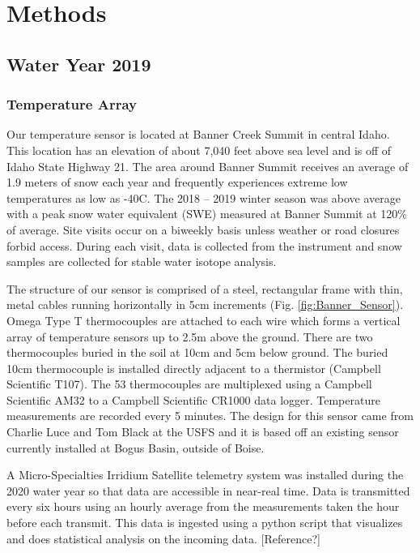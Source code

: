 \chapter{Methods}
\section{Water Year 2019} 
\subsection{Temperature Array}
Our temperature sensor is located at Banner Creek Summit in central Idaho. This location has an elevation of about 7,040 feet above sea level and is off of Idaho State Highway 21. The area around Banner Summit receives an average of 1.9 meters of snow each year and frequently experiences extreme low temperatures as low as -40\textdegree C. The 2018 -- 2019 winter season was above average with a peak snow water equivalent (SWE) measured at Banner Summit at 120\% of average. Site visits occur on a biweekly basis unless weather or road closures forbid access. During each visit, data is collected from the instrument and snow samples are collected for stable water isotope analysis.

The structure of our sensor is comprised of a steel, rectangular frame with thin, metal cables running horizontally in 5cm increments (Fig. \ref{fig:Banner_Sensor}). Omega Type T thermocouples are attached to each wire which forms a vertical array of temperature sensors up to 2.5m above the ground. There are two thermocouples buried in the soil at 10cm and 5cm below ground. The buried 10cm thermocouple is installed directly adjacent to a thermistor (Campbell Scientific T107). The 53 thermocouples are multiplexed using a Campbell Scientific AM32 to a Campbell Scientific CR1000 data logger. Temperature measurements are recorded every 5 minutes. The design for this sensor came from Charlie Luce and Tom Black at the USFS and it is based off an existing sensor currently installed at Bogus Basin, outside of Boise. 

A Micro-Specialties Irridium Satellite telemetry system was installed during the 2020 water year so that data are accessible in near-real time. Data is transmitted every six hours using an hourly average from the measurements taken the hour before each transmit. This data is ingested using a python script that visualizes and does statistical analysis on the incoming data. [Reference?] 

